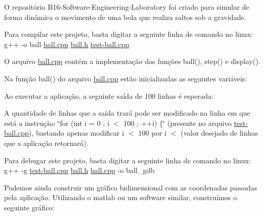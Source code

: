 O repositório B16-\/\+Software-\/\+Engineering-\/\+Laboratory foi criado para simular de forma dinâmica o movimento de uma bola que realiza saltos sob a gravidade.

Para compilar este projeto, basta digitar a seguinte linha de comando no linux\+: g++ -\/o ball \hyperlink{ball_8cpp}{ball.\+cpp} \hyperlink{ball_8h}{ball.\+h} \hyperlink{test-ball_8cpp}{test-\/ball.\+cpp}

O arquivo \hyperlink{ball_8cpp}{ball.\+cpp} contém a implementação das funções ball(), step() e display().

Na função ball() do arquivo \hyperlink{ball_8cpp}{ball.\+cpp} estão inicializadas as seguintes variáveis\+:



Ao executar a aplicação, a seguinte saída de 100 linhas é esperada\+:







A quantidade de linhas que a saída trará pode ser modificado na linha em que está a instrução\+: \char`\"{}for (int i = 0 ; i $<$ 100 ; ++i) \{\char`\"{} (presente no arquivo \hyperlink{test-ball_8cpp}{test-\/ball.\+cpp}), bastando apenas modificar \textquotesingle{}i $<$ 100\textquotesingle{} por \textquotesingle{}i $<$ (valor desejado de linhas que a aplicação retornará)\textquotesingle{}.

Para debugar este projeto, basta digitar a seguinte linha de comando no linux\+: g++ -\/g \hyperlink{test-ball_8cpp}{test-\/ball.\+cpp} \hyperlink{ball_8h}{ball.\+h} \hyperlink{ball_8cpp}{ball.\+cpp} -\/o ball\+\_\+gdb

Podemos ainda construir um gráfico bidimensional com as coordenadas passadas pela aplicação. Utilizando o matlab ou um software similar, construímos o seguinte gráfico\+:

 